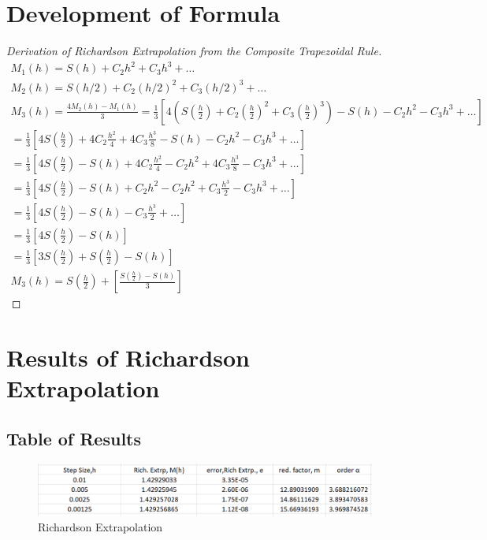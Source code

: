 \documentclass[12pt]{article}
\begin{document}
\section{Development of Formula}
\begin{proof}[Derivation of Richardson Extrapolation from the Composite Trapezoidal Rule]
\begin{eqnarray}
M_1(h) = S(h) + C_2h^2+ C_3h^3+ \hdots \\
M_2(h) = S(h/2) + C_2(h/2)^2 + C_3(h/2)^3 + \hdots \\
M_3(h) = \frac{4M_2(h)-M_1(h)}{3} = \frac{1}{3}[4(S(\frac{h}{2}) + C_2(\frac{h}{2})^2 + C_3(\frac{h}{2})^3)- S(h) - C_2h^2 - C_3h^3+ \hdots] \\
= \frac{1}{3}[4S(\frac{h}{2}) + 4C_2\frac{h^2}{4} + 4C_3\frac{h^3}{8}- S(h) - C_2h^2- C_3h^3+ \hdots] \\
=\frac{1}{3}[4S(\frac{h}{2}) - S(h) + 4C_2\frac{h^2}{4}  - C_2h^2 + 4C_3\frac{h^3}{8}- C_3h^3+ \hdots]\\
=\frac{1}{3}[4S(\frac{h}{2}) - S(h) + C_2h^2  - C_2h^2 + C_3\frac{h^3}{2}- C_3h^3+ \hdots]\\
=\frac{1}{3}[4S(\frac{h}{2}) - S(h) - C_3\frac{h^3}{2}+ \hdots]\\
=\frac{1}{3}[4S(\frac{h}{2}) - S(h)]\\
=\frac{1}{3}[3S(\frac{h}{2})+S(\frac{h}{2})-S(h)]\\
M_3(h) = S(\frac{h}{2})+[\frac{S(\frac{h}{2})-S(h)}{3}]
\end{eqnarray}
\end{proof}
\section{Results of Richardson Extrapolation}
\subsection{Table of Results}
\begin{figure}[H]
  \centering
  \includegraphics[width=15cm]{Rich_Extrp.png}
     \caption{Richardson Extrapolation}
         \label{FigVibStab}
\end{figure}
\end{document}
